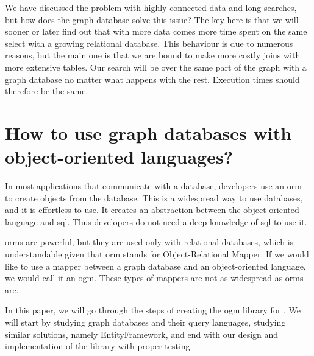 \begin{introduction}
    We have discussed the problem with highly connected data and long searches, but how does the graph database solve this issue?
    The key here is that we will sooner or later find out that with more data comes more time spent on the same select with a growing relational database.
    This behaviour is due to numerous reasons, but the main one is that we are bound to make more costly joins with more extensive tables.
    Our search will be over the same part of the graph with a graph database no matter what happens with the rest. Execution times should therefore be the same.

    \section{How to use graph databases with object-oriented languages?}

    In most applications that communicate with a database, developers use an \acrshort{orm} to create objects from the database.
    This is a widespread way to use databases, and it is effortless to use. It creates an abstraction between the object-oriented language and \acrshort{sql}.
    Thus developers do not need a deep knowledge of \acrshort{sql} to use it.

    \acrshort{orm}s are powerful, but they are used only with relational databases, which is understandable given that \acrshort{orm} stands for Object-Relational Mapper.
    If we would like to use a mapper between a graph database and an object-oriented language, we would call it an \acrfull{ogm}. These types of mappers are not as widespread as \acrshort{orm}s are.

    In this paper, we will go through the steps of creating the \acrshort{ogm} library for \CS.
    We will start by studying graph databases and their query languages, studying similar solutions, namely EntityFramework, and end with our design and implementation of the library with proper testing.

\end{introduction}
